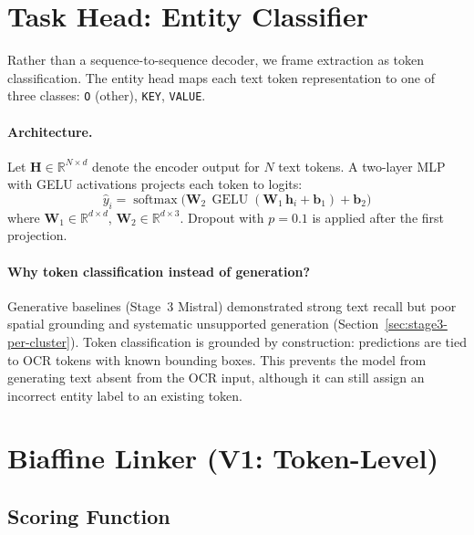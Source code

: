 \section{Task Head: Entity Classifier}
\label{sec:entity-classifier}

Rather than a sequence-to-sequence decoder, we frame extraction as token
classification. The entity head maps each text token representation to one of
three classes: \texttt{O} (other), \texttt{KEY}, \texttt{VALUE}.

\paragraph{Architecture.}
Let $\mathbf{H} \in \mathbb{R}^{N \times d}$ denote the encoder output for
$N$ text tokens. A two-layer MLP with GELU activations projects each token to
logits:
\[
  \hat{y}_i = \operatorname{softmax}\!\bigl(\mathbf{W}_2\,
    \operatorname{GELU}(\mathbf{W}_1\,\mathbf{h}_i + \mathbf{b}_1) +
    \mathbf{b}_2\bigr)
\]
where $\mathbf{W}_1 \in \mathbb{R}^{d \times d}$,
$\mathbf{W}_2 \in \mathbb{R}^{d \times 3}$. Dropout with $p = 0.1$ is applied
after the first projection.

\paragraph{Why token classification instead of generation?}
Generative baselines (Stage~3 Mistral) demonstrated strong text recall but
poor spatial grounding and systematic unsupported generation
(Section~\ref{sec:stage3-per-cluster}). Token classification is grounded by
construction: predictions are tied to OCR tokens with known bounding boxes.
This prevents the model from generating text absent from the OCR input,
although it can still assign an incorrect entity label to an existing token.

\section{Biaffine Linker (V1: Token-Level)}
\label{sec:biaffine-linker}

\subsection{Scoring Function}
\label{sec:kv-attention}

